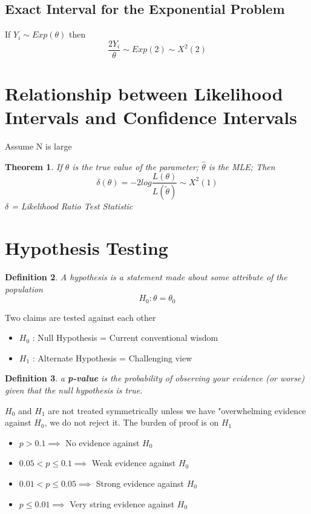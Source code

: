 \documentclass{article}
\newcounter{lecnum}
\newtheorem{theorem}{Theorem}[lecnum]
\newtheorem{definition}[theorem]{Definition}
\newenvironment{ablock}[1]{%
    \tcolorbox[beamer,%
    noparskip,breakable,
    colback=lightcoral,colframe=darkred,%
    colbacklower=tomato!75!lightcoral,%
    title=#1]}%
    {\endtcolorbox}
\begin{document}
\subsection*{Exact Interval for the Exponential Problem}
If \(Y_i \sim Exp(\theta) \) then 
$$ \frac{2 Y_i}{\theta} \sim Exp(2) \sim X^2(2) $$


\section{Relationship between Likelihood Intervals and Confidence Intervals}

Assume N is large 

\begin{theorem}
If \(\theta\) is the true value of the parameter; \(\hat{\theta}\) is the MLE; Then 
$$ \delta (\theta) = - 2 log \frac{L(\theta)}{L(\tilde{\theta})} \sim X^2 (1)	$$
\(\delta\) = Likelihood Ratio Test Statistic 
\end{theorem}

\section{Hypothesis Testing}
\begin{definition}
A hypothesis is a statement made about some attribute of the population
$$ H_ 0 : \theta = \theta_0 $$
\end{definition}

Two claims are tested against each other 
\begin{itemize}
\item \(H_0\) : Null Hypothesis = Current conventional wisdom 
\item \(H_1\) : Alternate Hypothesis = Challenging view
\end{itemize}

\begin{definition}
a \textbf{p-value} is the probability of observing your evidence (or worse) given that the null hypothesis is true. 
\end{definition}

\begin{ablock}{Notes}
\(H_0\) and \(H_1\) are not treated symmetrically unless we have "overwhelming evidence against \(H_0\), we do not reject it. The burden of proof is on \(H_1\)
\end{ablock}

\begin{itemize}
\item \(p > 0.1 \implies\) No evidence against \(H_0\)
\item \(0. 05 < p \leq 0.1 \implies \) Weak evidence against \(H_0\)
\item \(0.01 <  p \leq 0.05 \implies \) Strong evidence against \(H_0\) 
\item \(p \leq 0.01 \implies\) Very string evidence against \(H_0\) 
\end{itemize}
\end{document}
